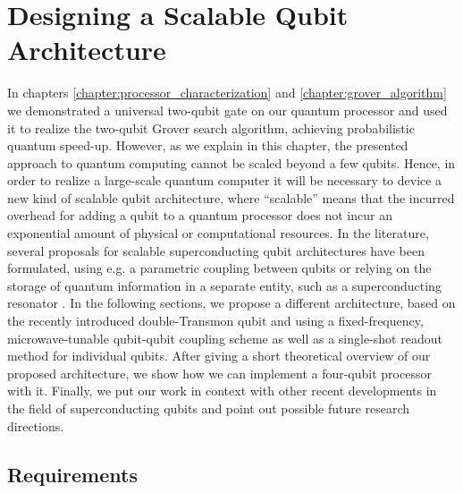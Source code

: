 \chapter{Designing a Scalable Qubit Architecture} \label{chapter:conclusions}

In chapters \ref{chapter:processor_characterization} and \ref{chapter:grover_algorithm} we demonstrated a universal two-qubit gate on our quantum processor and used it to realize the two-qubit Grover search algorithm, achieving probabilistic quantum speed-up. However, as we explain in this chapter, the presented approach to quantum computing cannot be scaled beyond a few qubits. Hence, in order to realize a large-scale quantum computer it will be necessary to device a new kind of scalable qubit architecture, where ``scalable'' means that the incurred overhead for adding a qubit to a quantum processor does not incur an exponential amount of physical or computational resources. In the literature, several proposals for scalable superconducting qubit architectures have been formulated, using e.g. a parametric coupling between qubits \citep{bertet_parametric_2006} or relying on the storage of quantum information in a separate entity, such as a superconducting resonator \citep{galiautdinov_resonatorzero-qubit_2012,mariantoni_implementing_2011}. In the following sections, we propose a different architecture, based on the recently introduced double-Transmon qubit \citep{gambetta_superconducting_2011,srinivasan_tunable_2011} and using a fixed-frequency, microwave-tunable qubit-qubit coupling scheme as well as a single-shot readout method for individual qubits. After giving a short theoretical overview of our proposed architecture, we show how we can implement a four-qubit processor with it. Finally, we put our work in context with other recent developments in the field of superconducting qubits and point out possible future research directions.

\section{Requirements} \label{section:scalable_architecture}


